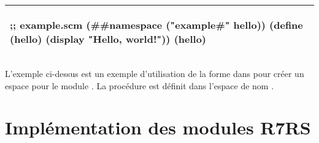 \begin{center}
  \begin{tabular}{|l|}
\hline
\begin{mplisting}{0.6}
;; example.scm
(##namespace ("example#" hello))
(define (hello)
  (display "Hello, world!\n"))
(hello)
\end{mplisting}\\\hline
  \end{tabular}
\end{center}
L'exemple ci-dessus est un exemple d'utilisation de la forme 
dans pour créer un espace pour le module . La procédure 
est définit dans l'espace de nom .

\section{Implémentation des modules R7RS}
